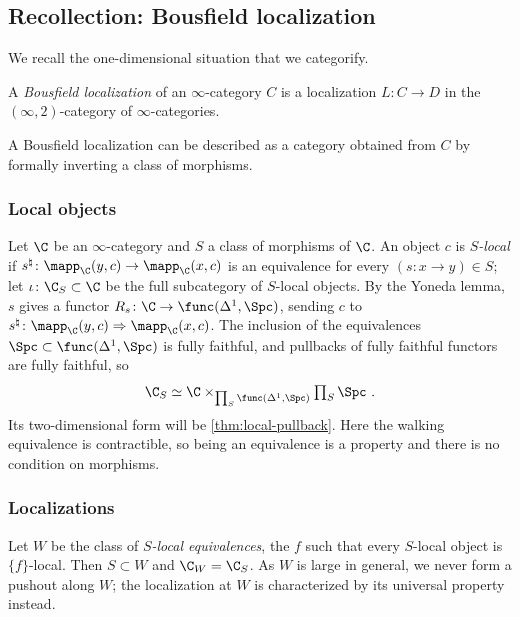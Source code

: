 \subsection{Recollection: Bousfield localization}
\label{subsec:2dloc-bousfield}

%
We recall the one-dimensional situation that we categorify.

\begin{defi}
%
A \emph{Bousfield localization} of an $ \infty $-category $ C $
is a localization $ L: C \to D $ in the $ (\infty,
2) $-category of $ \infty $-categories.
\end{defi}

%
A Bousfield localization can be described as a category obtained from $ C $ by
formally
inverting a class of morphisms.

\subsubsection*{Local objects}
%
Let $\C$ be an $\infty$-category and $S$ a class of morphisms of $\C$.
An object $c$ is \emph{$S$-local} if
$s^{\natural}\colon \mapp_{\C}(y,c) \to \mapp_{\C}(x,c)$
is an equivalence for every
$(s\colon x \to y) \in S$;
let
$\iota\colon \C_{S} \subset \C$
be the full subcategory of $S$-local objects.
By the Yoneda lemma, $s$ gives a functor
$R_{s}\colon \C \to \func(\Delta^{1},\Spc)$,
sending $ c $ to
$s^{\natural}\colon \mapp_{\C}(y,c) \Rightarrow \mapp_{\C}(x,c)$.
The inclusion of the equivalences
$\Spc \subset \func(\Delta^{1},\Spc)$
is fully faithful, and pullbacks of fully faithful functors are fully faithful,
so
\begin{equation}
\label{eq:bousfield-pullback}
\C_{S} \simeq \C \times_{\prod_{S}\func(\Delta^{1},\Spc)}
\textstyle\prod_{S}\Spc \ .
\end{equation}
Its two-dimensional form will be \cref{thm:local-pullback}.
Here the walking equivalence is contractible,
so being an equivalence is a property and there is no condition on morphisms.

\subsubsection*{Localizations}
%
Let $W$ be the class of \emph{$S$-local equivalences},
the $f$ such that every $S$-local object is $\{f\}$-local.
Then $S \subset W$ and $\C_{W} = \C_{S}$. As $W$ is large in general,
we never form a pushout along $W$; the localization at $W$ is characterized by
its universal property instead.

